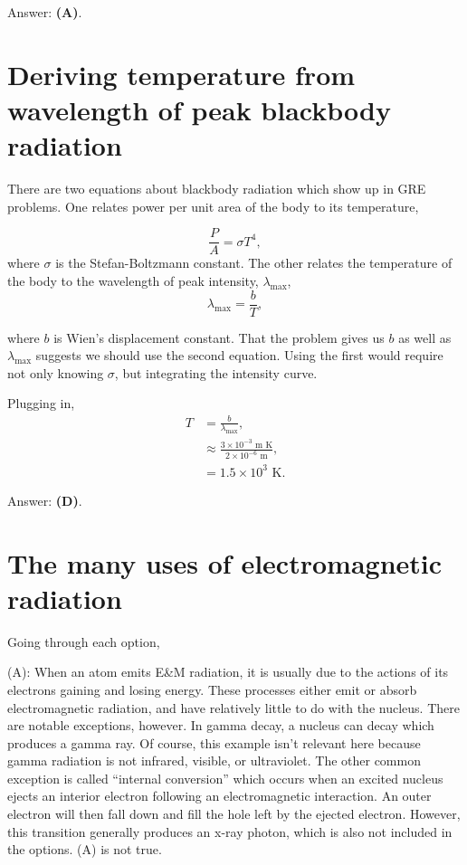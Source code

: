 \documentclass[11pt]{paper}
\newcommand{\answer}[1]{Answer: \textbf{(#1)}.}
\begin{document}
\answer{A}

\section{Deriving temperature from wavelength of peak blackbody radiation}

There are two equations about blackbody radiation which show up in GRE problems.  One relates power per unit area of the body to its temperature,

\begin{equation}
\frac{P}{A} = \sigma T^4,
\end{equation}
where $\sigma$ is the Stefan-Boltzmann constant.  The other relates the temperature of the body to the wavelength of peak intensity, $\lambda_\text{max}$,
\begin{equation}
\lambda_\text{max} = \frac{b}{T},
\end{equation}

where $b$ is Wien's displacement constant.  That the problem gives us $b$ as well as $\lambda_\text{max}$ suggests we should use the second equation.  Using the first would require not only knowing $\sigma$, but integrating the intensity curve.

Plugging in,
\begin{align}
T &= \frac{b}{\lambda_\text{max}},\\
&\approx \frac{3\times 10^{-3}\text{ m K}}{2\times 10^{-6}\text{ m}},\\
&= 1.5\times 10^3 \text{ K}.
\end{align}

\answer{D}

\section{The many uses of electromagnetic radiation}

Going through each option,

(A):  When an atom emits E\&M radiation, it is usually due to the actions of its electrons gaining and losing energy.  These processes either emit or absorb electromagnetic radiation, and have relatively little to do with the nucleus.  There are notable exceptions, however.  In gamma decay, a nucleus can decay which produces a gamma ray.  Of course, this example isn't relevant here because gamma radiation is not infrared, visible, or ultraviolet.  The other common exception is called ``internal conversion'' which occurs when an excited nucleus ejects an interior electron following an electromagnetic interaction.  An outer electron will then fall down and fill the hole left by the ejected electron.  However, this transition generally produces an x-ray photon, which is also not included in the options.  (A) is not true.
\end{document}
